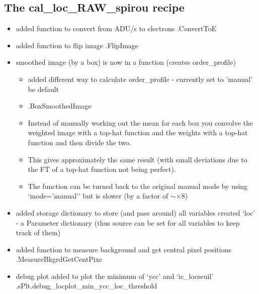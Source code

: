\subsection{The cal\_loc\_RAW\_spirou recipe}
\label{ch:changelog:At4:cal_loc_RAW_spirou}

\begin{itemize}

\item added function to convert from ADU/s to electrons \spirouImage.ConvertToE
    
\item added function to flip image \spirouImage.FlipImage

\item smoothed image (by a box) is now in a function (creates order\_profile)
	\begin{itemize}
	\item added different way to calculate order\_profile - currently set to 'manual' be default
	\item \spirouLOCOR.BoxSmoothedImage 
	\item Instead of manually working out the mean for each box you convolve the weighted image with a top-hat function and the weights with a top-hat function and then divide the two.
	\item This gives approximately the same result (with small deviations due to the FT of a top-hat function not being perfect).
	\item The function can be turned back to the original manual mode by using `mode='manual'' but is slower (by a factor of $\sim\times$8)
	\end{itemize}

\item added storage dictionary to store (and pass around) all variables created `loc' - a Parameter dictionary (thus source can be set for all variables to keep track of them)

\item added function to measure background and get central pixel positions \spirouLOCOR.MeasureBkgrdGetCentPixs

\item debug plot added to plot the minimum of `ycc' and `ic\_locseuil' \spirouPlot.sPlt.debug\_locplot\_min\_ycc\_loc\_threshold


\end{itemize}
